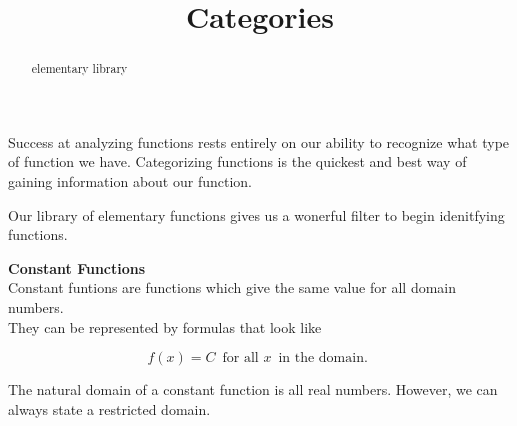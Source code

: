 \documentclass{ximera}
\title{Categories}
\begin{document}
\begin{abstract}
elementary library
\end{abstract}
\maketitle




Success at analyzing functions rests entirely on our ability to recognize what type of function we have.  Categorizing functions is the quickest and best way of gaining information about our function.

Our library of elementary functions gives us a wonerful filter to begin idenitfying functions.  \\



\begin{template}  \textbf{\textcolor{blue!55!black}{Constant Functions}} \\



Constant funtions are functions which give the same value for all domain numbers. \\


They can be represented by formulas that look like


\[ f(x) = C  \,  \text{ for all } x  \, \text{ in the domain. }   \]



\end{template}



The natural domain of a constant function is all real numbers.  However, we can always state a restricted domain.
\end{document}
